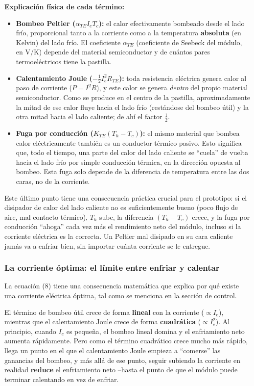 \documentclass[11pt,a4paper]{article}
\begin{document}
\textbf{Explicación física de cada término:}
\begin{itemize}
    \item \textbf{Bombeo Peltier ($\alpha_{TE} I_e T_c$):} el calor efectivamente bombeado desde el lado frío, proporcional tanto a la corriente como a la temperatura \textbf{absoluta} (en Kelvin) del lado frío. El coeficiente $\alpha_{TE}$ (coeficiente de Seebeck del módulo, en V/K) depende del material semiconductor y de cuántos pares termoeléctricos tiene la pastilla.
    \item \textbf{Calentamiento Joule ($-\frac{1}{2}I_e^2 R_{TE}$):} toda resistencia eléctrica genera calor al paso de corriente ($P=I^2R$), y este calor se genera \textit{dentro} del propio material semiconductor. Como se produce en el centro de la pastilla, aproximadamente la mitad de ese calor fluye hacia el lado frío (restándose del bombeo útil) y la otra mitad hacia el lado caliente; de ahí el factor $\frac{1}{2}$.
    \item \textbf{Fuga por conducción ($K_{TE}(T_h-T_c)$):} el mismo material que bombea calor eléctricamente también es un conductor térmico pasivo. Esto significa que, todo el tiempo, una parte del calor del lado caliente se ``cuela'' de vuelta hacia el lado frío por simple conducción térmica, en la dirección opuesta al bombeo. Esta fuga solo depende de la diferencia de temperatura entre las dos caras, no de la corriente.
\end{itemize}

Este último punto tiene una consecuencia práctica crucial para el prototipo: si el disipador de calor del lado caliente no es suficientemente bueno (poco flujo de aire, mal contacto térmico), $T_h$ sube, la diferencia $(T_h-T_c)$ crece, y la fuga por conducción ``ahoga'' cada vez más el rendimiento neto del módulo, incluso si la corriente eléctrica es la correcta. Un Peltier mal disipado en su cara caliente jamás va a enfriar bien, sin importar cuánta corriente se le entregue.

\subsubsection{La corriente óptima: el límite entre enfriar y calentar}
La ecuación (8) tiene una consecuencia matemática que explica por qué existe una corriente eléctrica óptima, tal como se menciona en la sección de control.

El término de bombeo útil crece de forma \textbf{lineal} con la corriente ($\propto I_e$), mientras que el calentamiento Joule crece de forma \textbf{cuadrática} ($\propto I_e^2$). Al principio, cuando $I_e$ es pequeña, el bombeo lineal domina y el enfriamiento neto aumenta rápidamente. Pero como el término cuadrático crece mucho más rápido, llega un punto en el que el calentamiento Joule empieza a ``comerse'' las ganancias del bombeo, y más allá de ese punto, seguir subiendo la corriente en realidad \textbf{reduce} el enfriamiento neto --hasta el punto de que el módulo puede terminar calentando en vez de enfriar.
\end{document}
